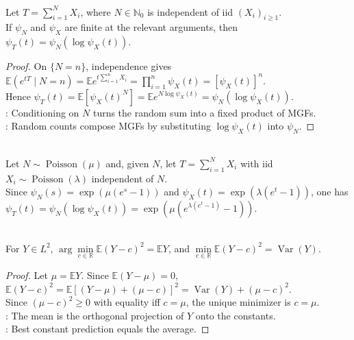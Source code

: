\begin{proposition} \label{prop:random-sum-mgf-composition} \\
Let $T=\sum\limits_{i=1}^{N}X_i$, where $N\in\mathbb{N}_0$ is independent of iid $(X_i)_{i\geq1}$.\\
If $\psi_N$ and $\psi_X$ are finite at the relevant arguments, then $\psi_T(t)=\psi_N(\log\psi_X(t))$.
\begin{proof}
On $\{N=n\}$, independence gives $\mathbb{E}(e^{tT}\mid N=n)=\mathbb{E}e^{t\sum\limits_{i=1}^{n}X_i}=\prod\limits_{i=1}^{n}\psi_X(t)=[\psi_X(t)]^n$.\\
Hence $\psi_T(t)=\mathbb{E}[\psi_X(t)^N]=\mathbb{E}e^{N\log\psi_X(t)}=\psi_N(\log\psi_X(t))$.\\
: Conditioning on $N$ turns the random sum into a fixed product of MGFs.\\
: Random counts compose MGFs by substituting $\log\psi_X(t)$ into $\psi_N$.
\end{proof}
\end{proposition}

\begin{example} \label{ex:compound-poisson-mgf} \\
Let $N\sim\operatorname{Poisson}(\mu)$ and, given $N$, let $T=\sum\limits_{i=1}^{N}X_i$ with iid $X_i\sim\operatorname{Poisson}(\lambda)$ independent of $N$.\\
Since $\psi_N(s)=\exp(\mu(e^s-1))$ and $\psi_X(t)=\exp(\lambda(e^t-1))$, one has $\psi_T(t)=\psi_N(\log\psi_X(t))=\exp(\mu(e^{\lambda(e^t-1)}-1))$.
\end{example}

\begin{proposition} \label{prop:best-constant-l2-predictor} \\
For $Y\in L^2$, $\arg\min\limits_{c\in\mathbb{R}}\mathbb{E}(Y-c)^2=\mathbb{E}Y$, and $\min\limits_{c\in\mathbb{R}}\mathbb{E}(Y-c)^2=\operatorname{Var}(Y)$.
\begin{proof}
Let $\mu=\mathbb{E}Y$. Since $\mathbb{E}(Y-\mu)=0$, $\mathbb{E}(Y-c)^2=\mathbb{E}[(Y-\mu)+(\mu-c)]^2=\operatorname{Var}(Y)+(\mu-c)^2$.\\
Since $(\mu-c)^2\geq0$ with equality iff $c=\mu$, the unique minimizer is $c=\mu$.\\
: The mean is the orthogonal projection of $Y$ onto the constants.\\
: Best constant prediction equals the average.
\end{proof}
\end{proposition}

